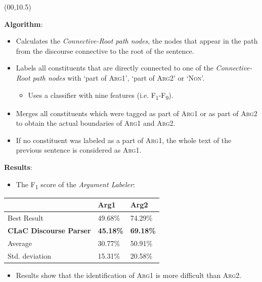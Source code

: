 \documentclass{article}
\def\CHead#1{\begin{center}\noindent{\LARGE\color{DarkBlue} #1}\end{center}}
\renewcommand{\LARGE}{\fontsize{43}{54}\selectfont}
\begin{document}
\begin{textblock}{10}(00,10.5)
\CHead{IV. Argument Labeler}
\textbf{Algorithm}:
\begin{itemize}
\item Calculates the \textit{Connective-Root path nodes}, the nodes that appear in the path from the discourse connective to the root of the sentence.
\item Labels all constituents that are directly connected to one of the \textit{Connective-Root path nodes} with `part of \textsc{Arg1}', `part of \textsc{Arg2}' or `\textsc{Non}'.
\begin{itemize}
\item Uses a classifier with nine features (i.e. F\textsubscript{1}-F\textsubscript{9}).
\end{itemize}
\item Merges all constituents which were tagged as part of \textsc{Arg1} or as part of \textsc{Arg2} to obtain the actual boundaries of \textsc{Arg1} and \textsc{Arg2}.
\item If no constituent was labeled as a part of \textsc{Arg1}, the whole text of the previous sentence is considered as \textsc{Arg1}.
\end{itemize}

\textbf{Results}:
\begin{itemize}
\item The F\textsubscript{1} score of the \textit{Argument Labeler}:
\end{itemize}

\begin{table}[]
\centering
\begin{tabular}{|l|l|l|}
\hline
    & \textbf{Arg1}    & \textbf{Arg2}    \\ \hline
Best Result    & 49.68\% & 74.29\% \\
\textbf{CLaC Discourse Parser}    & \textbf{45.18\%} & \textbf{69.18\%} \\
Average & 30.77\% & 50.91\% \\ \hline
Std. deviation     & 15.31\% & 20.58\% \\ \hline
\end{tabular}
\label{tab:arg}
\end{table}
\begin{itemize}
\item Results show that the identification of \textsc{Arg1} is more difficult than \textsc{Arg2}.
\end{itemize}


\end{textblock}
\end{document}
